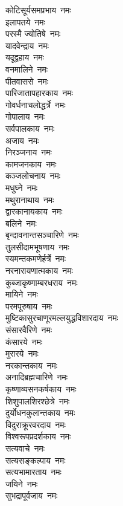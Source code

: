 \begin{multicols}{2}
\begin{flushleft}
कोटिसूर्यसमप्रभाय~नमः\hfill{}\\
इलापतये~नमः\\
परस्मै ज्योतिषे~नमः\\
यादवेन्द्राय~नमः\\
यदूद्वहाय~नमः\\
वनमालिने~नमः\\
पीतवाससे~नमः\\
पारिजातापहारकाय~नमः\\
गोवर्धनाचलोद्धर्त्रे~नमः\\
गोपालाय~नमः\\
सर्वपालकाय~नमः\hfill{}\\
अजाय~नमः\\
निरञ्जनाय~नमः\\
कामजनकाय~नमः\\
कञ्जलोचनाय~नमः\\
मधुघ्ने~नमः\\
मथुरानाथाय~नमः\\
द्वारकानायकाय~नमः\\
बलिने~नमः\\
बृन्दावनान्तसञ्चारिणे~नमः\\
तुलसीदामभूषणाय~नमः\hfill{}\\
स्यमन्तकमणेर्हर्त्रे~नमः\\
नरनारायणात्मकाय~नमः\\
कुब्जाकृष्णाम्बरधराय~नमः\\
मायिने~नमः\\
परमपूरुषाय~नमः\\
मुष्टिकासुरचाणूर\-मल्लयुद्ध\-विशारदाय~नमः\\
संसारवैरिणे~नमः\\
कंसारये~नमः\\
मुरारये~नमः\\
नरकान्तकाय~नमः\hfill{}\\
अनादिब्रह्मचारिणे~नमः\\
कृष्णाव्यसनकर्षकाय~नमः\\
शिशुपालशिरश्छेत्रे~नमः\\
दुर्योधनकुलान्तकाय~नमः\\
विदुराक्रूरवरदाय~नमः\\
विश्वरूपप्रदर्शकाय~नमः\\
सत्यवाचे~नमः\\
सत्यसङ्कल्पाय~नमः\\
सत्यभामारताय~नमः\\
जयिने~नमः\hfill{}\\
सुभद्रापूर्वजाय~नमः\\

\end{flushleft}
\end{multicols}
